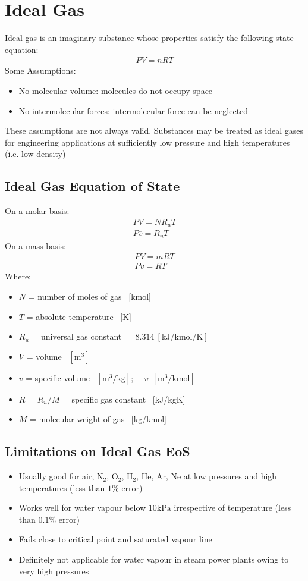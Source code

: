 \documentclass[class=report, crop=false, 12pt,a4paper]{standalone}
\begin{document}
\section{Ideal Gas}
Ideal gas is an imaginary substance whose properties satisfy the following state equation: 
\begin{gather}
  PV = nRT
\end{gather}
Some Assumptions:
\begin{itemize}[noitemsep]
  \item No molecular volume: molecules do not occupy space
  \item No intermolecular forces: intermolecular force can be neglected
\end{itemize}
These assumptions are not always valid. Substances may be treated as ideal gases for engineering applications at sufficiently low pressure and high temperatures (i.e. low density)
\subsection{Ideal Gas Equation of State}
On a molar basis:
\begin{gather}
  PV = NR_uT \\[5pt]
  P\overline{v} = R_uT
\end{gather}
On a mass basis:
\begin{gather}
  PV = mRT \\[5pt] 
  Pv = RT
\end{gather}
Where:
\begin{itemize}[noitemsep]
  \item $N$ = number of moles of gas \ [kmol]
  \item $T$ = absolute temperature \ [K]
  \item $R_u$ = universal gas constant $= 8.314 \ [\si{\kilo\joule\per\kilo\mole\per\kelvin}]$
  \item $V$ = volume \ $[\si{\metre\cubed}]$
  \item $v$ = specific volume \ $[\si{\metre\cubed\per\kilogram}]$; \ \ $\overline{v} \ \ [\si{\metre\cubed\per\kilo\mole}]$
  \item $R$ = $R_u/M$ = specific gas constant \ [kJ/kgK]
  \item $M$ = molecular weight of gas \ [kg/kmol]
\end{itemize}
\subsection{Limitations on Ideal Gas EoS}
\begin{itemize}
  \item Usually good for air, N$_2$, O$_2$, H$_2$, He, Ar, Ne at low pressures and high temperatures (less than $1\%$ error)
  \item Works well for water vapour below $10\si{\kilo\pascal}$ irrespective of temperature (less than $0.1\%$ error)
  \item Fails close to critical point and saturated vapour line
  \item Definitely not applicable for water vapour in steam power plants owing to very high pressures
\end{itemize}
\end{document}
